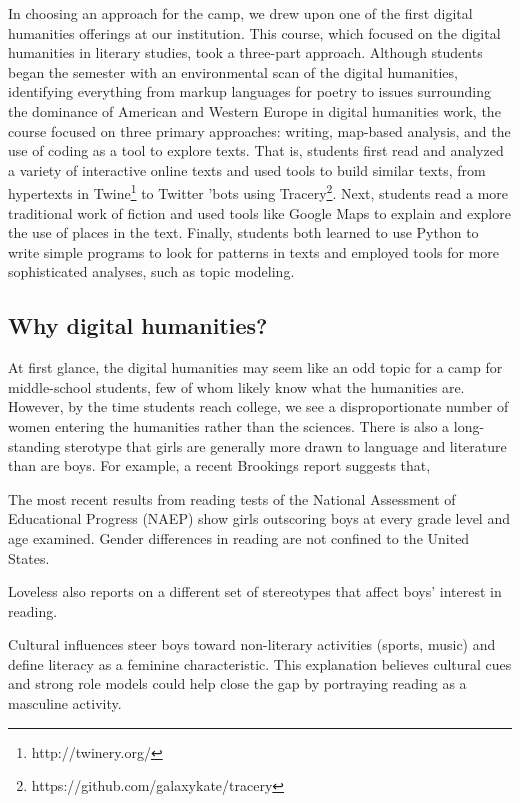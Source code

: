 In choosing an approach for the camp, we drew upon one of the first
digital humanities offerings at our institution.  This course, which
focused on the digital humanities in literary studies, took a
three-part approach.  Although students began the semester with an
environmental scan of the digital humanities, identifying everything
from markup languages for poetry to issues surrounding the dominance
of American and Western Europe in digital humanities work, the
course focused on three primary approaches: writing, map-based
analysis, and the use of coding as a tool to explore texts.  That
is, students first read and analyzed a variety of interactive online
texts and used tools to build similar texts, from hypertexts in
Twine\footnote{http://twinery.org/} to Twitter 'bots using
Tracery\footnote{https://github.com/galaxykate/tracery}.  Next,
students read a more traditional work of fiction and used tools
like Google Maps to explain and explore the use of places in the
text.  Finally, students both learned to use Python to write simple
programs to look for patterns in texts and employed tools for more
sophisticated analyses, such as topic modeling.

\subsection{Why digital humanities?}

At first glance, the digital humanities may seem like an odd topic
for a camp for middle-school students, few of whom likely know what
the humanities are.  However, by the time students reach college,
we see a disproportionate number of women entering the
humanities rather than the sciences.  There is also a long-standing
sterotype that girls are generally more drawn to language and literature
than are boys.  For example, a recent Brookings report \cite{Loveless2015}
suggests that,
\begin{blockquote}
The most recent results from reading tests of the National Assessment of Educational Progress (NAEP) show girls outscoring boys at every grade level and age examined. Gender differences in reading are not confined to the United States.
\end{blockquote}

Loveless also reports on a different set of stereotypes that affect
boys' interest in reading.  
\begin{blockquote}
Cultural influences steer boys
toward non-literary activities (sports, music) and define literacy
as a feminine characteristic. This explanation believes cultural
cues and strong role models could help close the gap by portraying
reading as a masculine activity.
\end{blockquote}

